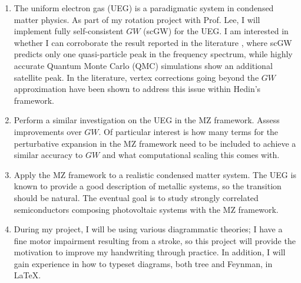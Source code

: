 \begin{enumerate}[label=\textbf{Aim \arabic*}]
    \item The uniform electron gas (UEG) is a paradigmatic system in condensed matter physics. As part of my rotation project with Prof. Lee, I will implement fully self-consistent $GW$ (scGW) for the UEG. I am interested in whether I can corroborate the result reported in the literature \cite{holm_fully_1998}, where scGW predicts only one quasi-particle peak in the frequency spectrum, while highly accurate Quantum Monte Carlo (QMC) simulations show an additional satellite peak. In the literature, vertex corrections going beyond the $GW$ approximation have been shown to address this issue within Hedin's framework.
    \item Perform a similar investigation on the UEG in the MZ framework. Assess improvements over $GW$. Of particular interest is how many terms for the perturbative expansion in the MZ framework need to be included to achieve a similar accuracy to $GW$ and what computational scaling this comes with.
    \item Apply the MZ framework to a realistic condensed matter system. The UEG is known to provide a good description of metallic systems, so the transition should be natural. The eventual goal is to study strongly correlated semiconductors composing photovoltaic systems with the MZ framework.
    \item During my project, I will be using various diagrammatic theories; I have a fine motor impairment resulting from a stroke, so this project will provide the motivation to improve my handwriting through practice. In addition, I will gain experience in how to typeset diagrams, both tree and Feynman, in \LaTeX.
\end{enumerate}